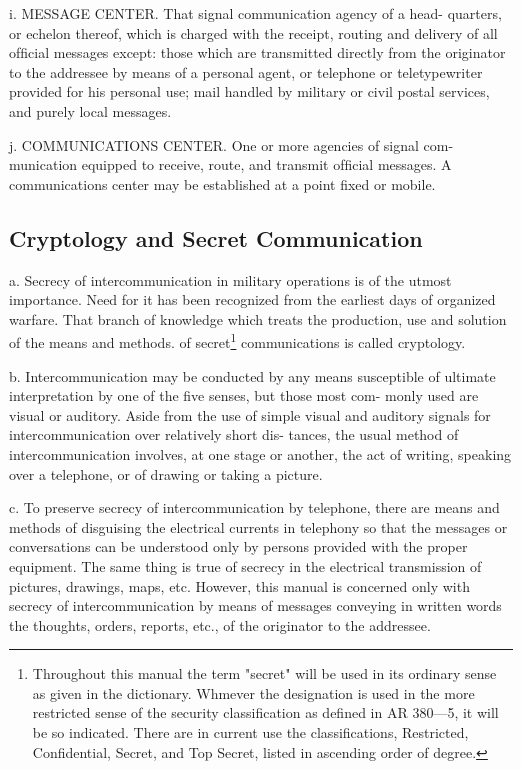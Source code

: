 i. MESSAGE CENTER. That signal communication agency of a head-
quarters, or echelon thereof, which is charged with the receipt, routing
and delivery of all ofﬁcial messages except: those which are transmitted
directly from the originator to the addressee by means of a personal
agent, or telephone or teletypewriter provided for his personal use; mail
handled by military or civil postal services, and purely local messages.

j. COMMUNICATIONS CENTER. One or more agencies of signal com-
munication equipped to receive, route, and transmit ofﬁcial messages. A
communications center may be established at a point ﬁxed or mobile.

\subsection{Cryptology and Secret Communication}

a. Secrecy of intercommunication in military operations is of the
utmost importance. Need for it has been recognized from the earliest
days of organized warfare. That branch of knowledge which treats the
production, use and solution of the means and methods. of secret\footnote{ Throughout this manual the term "secret" will be used in its ordinary sense as given in the dictionary. Whmever the designation is used in the more restricted sense of the security classiﬁcation as deﬁned in AR 380—5, it will be so indicated. There are in current use the classiﬁcations, Restricted, Conﬁdential, Secret, and Top Secret, listed in ascending order of degree.} communications is called cryptology.


b. Intercommunication may be conducted by any means susceptible of
ultimate interpretation by one of the ﬁve senses, but those most com-
monly used are visual or auditory. Aside from the use of simple visual
and auditory signals for intercommunication over relatively short dis-
tances, the usual method of intercommunication involves, at one stage
or another, the act of writing, speaking over a telephone, or of drawing
or taking a picture.

c. To preserve secrecy of intercommunication by telephone, there are
means and methods of disguising the electrical currents in telephony so
that the messages or conversations can be understood only by persons
provided with the proper equipment. The same thing is true of secrecy
in the electrical transmission of pictures, drawings, maps, etc. However,
this manual is concerned only with secrecy of intercommunication by
means of messages conveying in written words the thoughts, orders,
reports, etc., of the originator to the addressee.

